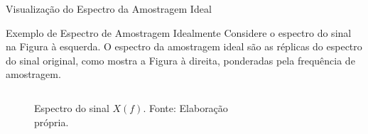 \documentclass{beamer}
\begin{document}
\begin{frame}{Visualização do Espectro da Amostragem Ideal}
    \begin{exampleblock}{Exemplo de Espectro de Amostragem Idealmente}
        Considere o espectro do sinal na Figura à esquerda. O espectro da amostragem ideal são as réplicas do espectro do sinal original, como mostra a Figura à direita, ponderadas pela frequência de amostragem.
    \end{exampleblock}

    \begin{columns}[t]
    
    
        \begin{figure}[H]
            \centering
    
            \caption{Espectro do sinal $X(f)$. Fonte: Elaboração própria.}
        \end{figure}
    
    
        \begin{figure}[H]
            \centering
\end{figure}
\end{columns}
\end{frame}
\end{document}
